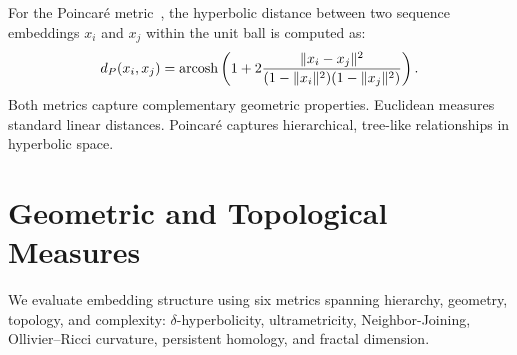 \documentclass[]{Liebert_Author_revised}
\begin{document}
For the Poincaré metric~\citeauthor{nickel2017poincare}, the hyperbolic distance between two sequence embeddings $x_i$ and $x_j$ within the unit ball is computed as:
\begin{equation}
\scriptsize
d_P(x_i, x_j) = \mathrm{arcosh} \left( 1 + 2 \frac{\|x_i - x_j\|^2}{(1 - \|x_i\|^2)(1 - \|x_j\|^2)} \right).
\end{equation}
Both metrics capture complementary geometric properties. Euclidean measures standard linear distances. Poincaré captures hierarchical, tree-like relationships in hyperbolic space.







\section{Geometric and Topological Measures}
\label{sec_evaluation_metrics}

We evaluate embedding structure using six metrics spanning hierarchy, geometry, topology, and complexity: $\delta$-hyperbolicity, ultrametricity, Neighbor-Joining, Ollivier–Ricci curvature, persistent homology, and fractal dimension.


\end{document}

